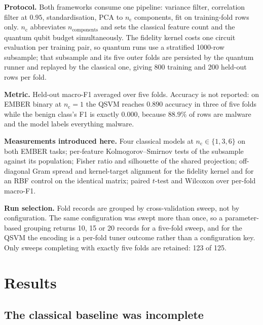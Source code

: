 \documentclass[10pt]{article}
\newcommand{\nc}{\ensuremath{n_{\mathrm{c}}}}
\begin{document}
\textbf{Protocol.} Both frameworks consume one pipeline: variance filter,
correlation filter at $0.95$, standardisation, PCA to \nc{} components, fit on
training-fold rows only. \nc{} abbreviates $n_{\mathrm{components}}$ and sets the
classical feature count and the quantum qubit budget simultaneously. The fidelity
kernel costs one circuit evaluation per training pair, so quantum runs use a
stratified 1000-row subsample; that subsample and its five outer folds are
persisted by the quantum runner and replayed by the classical one, giving 800
training and 200 held-out rows per fold.

\textbf{Metric.} Held-out macro-F1 averaged over five folds. Accuracy is not
reported: on EMBER binary at $\nc{}=1$ the QSVM reaches $0.890$ accuracy in three
of five folds while the benign class's F1 is exactly $0.000$, because $88.9\%$ of
rows are malware and the model labels everything malware.

\textbf{Measurements introduced here.} Four classical models at
$\nc{}\in\{1,3,6\}$ on both EMBER tasks; per-feature Kolmogorov--Smirnov tests of
the subsample against its population; Fisher ratio and silhouette of the shared
projection; off-diagonal Gram spread and kernel-target alignment for the fidelity
kernel and for an RBF control on the identical matrix; paired $t$-test and
Wilcoxon over per-fold macro-F1.

\textbf{Run selection.} Fold records are grouped by cross-validation sweep, not by
configuration. The same configuration was swept more than once, so a
parameter-based grouping returns 10, 15 or 20 records for a five-fold sweep, and
for the QSVM the encoding is a per-fold tuner outcome rather than a configuration
key. Only sweeps completing with exactly five folds are retained: 123 of 125.

\section{Results}

\subsection{The classical baseline was incomplete}
\end{document}
